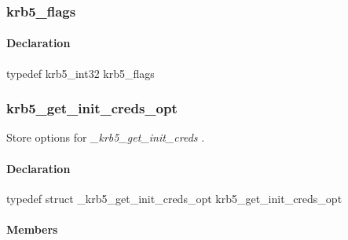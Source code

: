 \documentclass[letterpaper,10pt,english]{sphinxmanual}
\begin{document}
\subsubsection{krb5\_flags}
\label{appdev/refs/types/krb5_flags:krb5-flags-struct}\label{appdev/refs/types/krb5_flags:krb5-flags}\label{appdev/refs/types/krb5_flags::doc}

\begin{fulllineitems}
\label{appdev/refs/types/krb5_flags:krb5_flags}
\end{fulllineitems}



\paragraph{Declaration}
\label{appdev/refs/types/krb5_flags:declaration}
typedef krb5\_int32 krb5\_flags


\subsubsection{krb5\_get\_init\_creds\_opt}
\label{appdev/refs/types/krb5_get_init_creds_opt:krb5-get-init-creds-opt-struct}\label{appdev/refs/types/krb5_get_init_creds_opt::doc}\label{appdev/refs/types/krb5_get_init_creds_opt:krb5-get-init-creds-opt}

\begin{fulllineitems}
\label{appdev/refs/types/krb5_get_init_creds_opt:krb5_get_init_creds_opt}
\end{fulllineitems}


Store options for \emph{\_krb5\_get\_init\_creds} .


\paragraph{Declaration}
\label{appdev/refs/types/krb5_get_init_creds_opt:declaration}
typedef struct \_krb5\_get\_init\_creds\_opt  krb5\_get\_init\_creds\_opt


\paragraph{Members}
\label{appdev/refs/types/krb5_get_init_creds_opt:members}

\begin{fulllineitems}
\label{appdev/refs/types/krb5_get_init_creds_opt:krb5_get_init_creds_opt.flags}
\end{fulllineitems}
\end{document}
